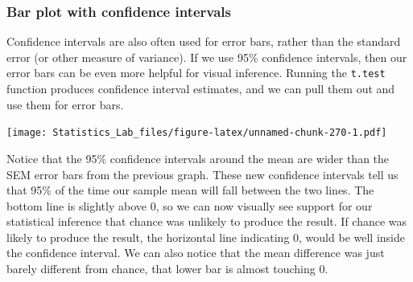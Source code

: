\documentclass[
]{book}
\newenvironment{Shaded}{\begin{snugshade}}{\end{snugshade}}
\newcommand{\AttributeTok}[1]{\textcolor[rgb]{0.77,0.63,0.00}{#1}}
\newcommand{\DecValTok}[1]{\textcolor[rgb]{0.00,0.00,0.81}{#1}}
\newcommand{\FunctionTok}[1]{\textcolor[rgb]{0.00,0.00,0.00}{#1}}
\newcommand{\NormalTok}[1]{#1}
\newcommand{\OtherTok}[1]{\textcolor[rgb]{0.56,0.35,0.01}{#1}}
\newcommand{\SpecialCharTok}[1]{\textcolor[rgb]{0.00,0.00,0.00}{#1}}
\newcommand{\StringTok}[1]{\textcolor[rgb]{0.31,0.60,0.02}{#1}}
\begin{document}
\hypertarget{bar-plot-with-confidence-intervals}{%
\subsubsection{Bar plot with confidence intervals}\label{bar-plot-with-confidence-intervals}}

Confidence intervals are also often used for error bars, rather than the standard error (or other measure of variance). If we use 95\% confidence intervals, then our error bars can be even more helpful for visual inference. Running the \texttt{t.test} function produces confidence interval estimates, and we can pull them out and use them for error bars.

\begin{Shaded}
\end{Shaded}

\texttt{[image: Statistics\_Lab\_files/figure-latex/unnamed-chunk-270-1.pdf]}

Notice that the 95\% confidence intervals around the mean are wider than the SEM error bars from the previous graph. These new confidence intervals tell us that 95\% of the time our sample mean will fall between the two lines. The bottom line is slightly above 0, so we can now visually see support for our statistical inference that chance was unlikely to produce the result. If chance was likely to produce the result, the horizontal line indicating 0, would be well inside the confidence interval. We can also notice that the mean difference was just barely different from chance, that lower bar is almost touching 0.
\end{document}

